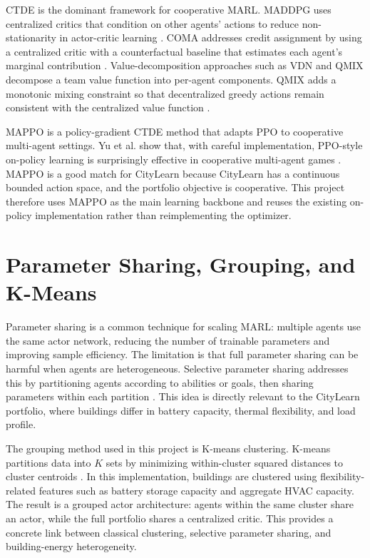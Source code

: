 CTDE is the dominant framework for cooperative MARL. MADDPG uses centralized
critics that condition on other agents' actions to reduce non-stationarity in
actor-critic learning \cite{maddpg2017}. COMA addresses credit assignment by
using a centralized critic with a counterfactual baseline that estimates each
agent's marginal contribution \cite{coma2018}. Value-decomposition approaches
such as VDN and QMIX decompose a team value function into per-agent components.
QMIX adds a monotonic mixing constraint so that decentralized greedy actions
remain consistent with the centralized value function \cite{vdn2017,qmix2018}.

MAPPO is a policy-gradient CTDE method that adapts PPO to cooperative
multi-agent settings. Yu et al. show that, with careful implementation,
PPO-style on-policy learning is surprisingly effective in cooperative
multi-agent games \cite{mappo2022}. MAPPO is a good match for CityLearn because
CityLearn has a continuous bounded action space, and the portfolio objective is
cooperative. This project therefore uses MAPPO as the main learning backbone and
reuses the existing on-policy implementation rather than reimplementing the
optimizer.

\section{Parameter Sharing, Grouping, and K-Means}

Parameter sharing is a common technique for scaling MARL: multiple agents use
the same actor network, reducing the number of trainable parameters and
improving sample efficiency. The limitation is that full parameter sharing can
be harmful when agents are heterogeneous. Selective parameter sharing addresses
this by partitioning agents according to abilities or goals, then sharing
parameters within each partition \cite{seps2021}. This idea is directly
relevant to the CityLearn portfolio, where buildings differ in battery capacity,
thermal flexibility, and load profile.

The grouping method used in this project is K-means clustering. K-means
partitions data into $K$ sets by minimizing within-cluster squared distances to
cluster centroids \cite{kmeans1967}. In this implementation, buildings are
clustered using flexibility-related features such as battery storage capacity
and aggregate HVAC capacity. The result is a grouped actor architecture: agents
within the same cluster share an actor, while the full portfolio shares a
centralized critic. This provides a concrete link between classical clustering,
selective parameter sharing, and building-energy heterogeneity.

